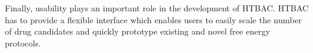 Finally, usability plays an important role in the development of HTBAC. HTBAC
has to provide a flexible interface which enables users to easily scale the
number of drug candidates and quickly prototype existing and novel free
energy protocols.












